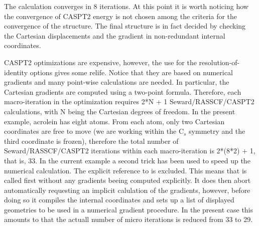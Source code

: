 The calculation converges in 8 iterations. At this point it is worth noticing
how the convergence of CASPT2 energy is not chosen among the criteria for the
convergence of the structure. The final structure is in fact decided by checking the
Cartesian displacements and the gradient in non-redundant internal coordinates.

CASPT2 optimizations are expensive, however, the use for the resolution-of-identity
options gives some relife. Notice that they are based on numerical
gradients and many point-wise calculations are needed. In particular, 
the Cartesian gradients are computed using a two-point formula. 
Therefore, each macro-iteration
in the optimization requires 2*N + 1 Seward/RASSCF/CASPT2 calculations, with N being
the Cartesian degrees of freedom. In the present example, acrolein has eight atoms.
From each atom, only two Cartesian coordinates are free to move (we are working 
within the C$_s$ symmetry and the third coordinate is frozen), therefore the 
total number of Seward/RASSCF/CASPT2 iterations within each macro-iteration
is 2*(8*2) + 1, that is, 33. In the current example a second trick has been
used to speed up the numerical calculation. The explicit reference to 
is excluded. This means that  is called first without any gradients
beeing computed explicitly. It does then abort automatically requesting an implicit
calulation of the gradients, however, before doing so it compiles the internal coordinates
and sets up a list of displayed geometries to be used in a numerical gradient procedure.
In the present case this amounts to that the actuall number of micro iterations is
reduced from 33 to 29.




